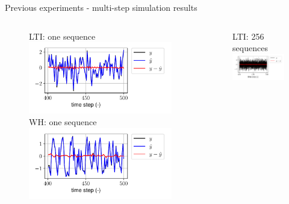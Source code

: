 \documentclass{beamer}
\begin{document}
\begin{frame}{Previous experiments - multi-step simulation results}
\begin{columns}[t]
\begin{center}
\begin{figure}
LTI: one sequence
\includegraphics[width=\textwidth]{fig/lin_sim_single.pdf}
WH: one sequence
\includegraphics[width=\textwidth]{fig/wh_sim_single.pdf}
\end{figure}
\end{center}
\begin{center}
\begin{figure}
LTI: 256 sequences
\includegraphics[width=\textwidth]{fig/lin_sim_batch.pdf}

\end{figure}
\end{center}
\end{columns}
\end{frame}
\end{document}
